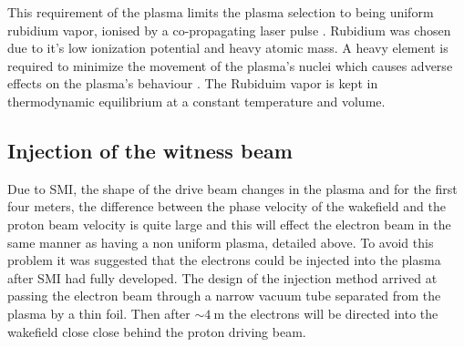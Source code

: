 This requirement of the plasma limits the plasma selection to being uniform
rubidium vapor, ionised by a co-propagating laser pulse \cite{oz2014novel,
oz2014bja}.  Rubidium was chosen due to it's low ionization potential and heavy
atomic mass.  A heavy element is required to minimize the movement of the
plasma's nuclei which causes adverse effects on the plasma's behaviour
\cite{vieira2012nj, vieira2014bqa}. The Rubiduim vapor is kept in thermodynamic
equilibrium at a constant temperature and volume.

\subsection{Injection of the witness beam}

Due to SMI, the shape of the drive beam changes in the plasma and for the first
four meters, the difference between the phase velocity of the wakefield and the
proton beam velocity is quite large and this will effect the electron beam in
the same manner as having a non uniform plasma, detailed above. To avoid this
problem it was suggested that the electrons could be injected into the plasma
after SMI had fully developed. The design of the injection method arrived at
passing the electron beam through a narrow vacuum tube separated from the
plasma by a thin foil. Then after \(\sim \SI{4}{\meter}\) the electrons will be
directed into the wakefield close close behind the proton driving beam.

